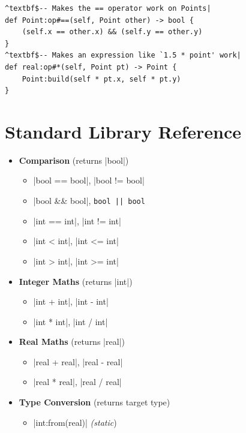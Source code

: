 \documentclass[11pt]{report}
\begin{document}
\begin{Verbatim}[commandchars=^$|]
^textbf$-- Makes the == operator work on Points|
def Point:op#==(self, Point other) -> bool {
    (self.x == other.x) && (self.y == other.y)
}
^textbf$-- Makes an expression like `1.5 * point' work|
def real:op#*(self, Point pt) -> Point {
    Point:build(self * pt.x, self * pt.y)
}
\end{Verbatim}


\clearpage
\section{Standard Library Reference}

\vspace{-0.5cm}
\setlength{\columnsep}{0cm}
\begin{multicols}{2}
\begin{itemize}[topsep=0pt,leftmargin=*]
    \item \textbf{Comparison} (returns |bool|)
    \begin{itemize}[nosep,topsep=0pt,leftmargin=*]
    \item |bool == bool|, |bool != bool|
    \item |bool && bool|, \Verb/bool || bool/
    \item |int == int|, |int != int|
    \item |int < int|, |int <= int|
    \item |int > int|, |int >= int|
    \end{itemize}
    \item \textbf{Integer Maths} (returns |int|)
    \begin{itemize}[nosep,topsep=0pt,leftmargin=*]
    \item |int + int|, |int - int|
    \item |int * int|, |int / int|
    \end{itemize}
    \item \textbf{Real Maths} (returns |real|)
    \begin{itemize}[nosep,topsep=0pt,leftmargin=*]
    \item |real + real|, |real - real|
    \item |real * real|, |real / real|
    \end{itemize}
    \item \textbf{Type Conversion} (returns target type)
    \begin{itemize}[nosep,topsep=0pt,leftmargin=*]
    \item |int:from(real)| \emph{(static})

\end{itemize}
\end{itemize}
\end{multicols}
\end{document}
